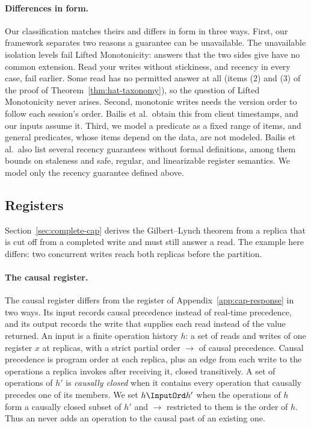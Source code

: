 \paragraph{Differences in form.}
Our classification matches theirs and differs in form in three ways.
First, our framework separates two reasons a guarantee can be unavailable.
The unavailable isolation levels fail Lifted Monotonicity: answers that the two
sides give have no common extension.  Read your writes without stickiness, and
recency in every case, fail earlier.  Some read has no permitted answer at all
(items (2) and (3) of the proof of Theorem~\ref{thm:hat-taxonomy}), so the
question of Lifted Monotonicity never arises.  Second, monotonic writes needs
the version order to follow each session's order.  Bailis et al.\ obtain this
from client timestamps, and our inputs assume it.  Third, we model a predicate
as a fixed range of items, and general predicates, whose items depend on the
data, are not modeled.  Bailis et al.\ also list several recency guarantees
without formal definitions, among them bounds on staleness and safe, regular,
and linearizable register semantics.  We model only the recency guarantee
defined above.

\subsection{Registers}
\label{app:registers}

Section~\ref{sec:complete-cap} derives the Gilbert--Lynch theorem from a
replica that is cut off from a completed write and must still answer a read.
The example here differs: two concurrent writes reach both replicas before the
partition.

\paragraph{The causal register.}
The causal register differs from the register of
Appendix~\ref{app:cap-response} in two ways.  Its input records causal
precedence instead of real-time precedence, and its output records the write
that supplies each read instead of the value returned.  An input is a finite operation history $h$: a set of reads and writes of one
register $x$ at replicas, with a strict partial order $\to$ of causal
precedence.  Causal precedence is program order at each replica, plus an edge
from each write to the operations a replica invokes after receiving it,
closed transitively.  A set of operations of $h'$ is \emph{causally closed}
when it contains every operation that causally precedes one of its members.
We set $h\InputOrd h'$ when the operations of $h$ form a causally closed
subset of $h'$ and $\to$ restricted to them is the order of $h$.  Thus an
\indesc never adds an operation to the causal past of an existing one.

